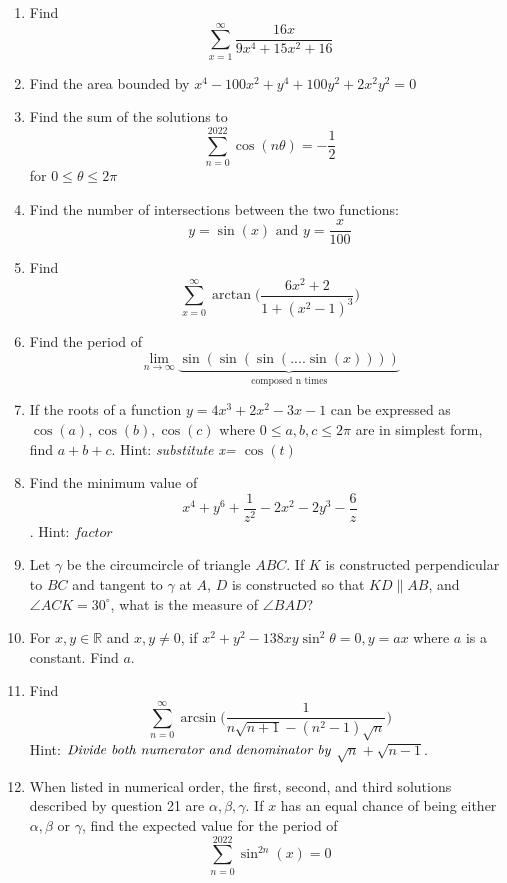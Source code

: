 \documentclass{article}
\begin{document}
\begin{enumerate}
    
    \item Find \[\sum_{x=1}^\infty \frac{16x}{9x^4+15x^2+16}\]
    \item Find the area bounded by $x^4-100x^2+y^4+100y^2+2x^2y^2=0$
    \newpage
    \item Find the sum of the solutions to \[\sum_{n=0}^{2022} \cos(n\theta) = -\frac{1}{2}\] for $ 0 \leq\theta \leq 2\pi$
    \item Find the number of intersections between the two functions: \[y=\sin(x) \textrm{ and } y=\frac{x}{100}\]
    \item Find \[\sum_{x=0}^\infty \arctan\Big(\frac{6x^2+2}{1+(x^2-1)^3}\Big)\]
    \item Find the period of \[\lim_{n \to \infty} \underbrace{\sin(\sin(\sin(....\sin(x))))}_{\text{composed n times}}\]
  	\item If the roots of a function $y=4x^3+2x^2-3x-1$ can be expressed as $\cos{(a)},\cos{(b)},\cos{(c)}$ where $ 0 \leq a,b,c \leq 2\pi$ are in simplest form, find $a+b+c$. Hint: \textit{substitute x= $\cos{(t)}$}
    \item Find the minimum value of \[x^4+y^6+\frac{1}{z^2}-2x^2-2y^3-\frac{6}{z}\]. Hint: $factor$
    \item Let $\gamma$ be the circumcircle of triangle $ABC$. If $K$ is constructed perpendicular to $BC$ and tangent to $\gamma$ at $A$, $D$ is constructed so that $KD\parallel AB$, and $\angle ACK = 30^{\circ}$, what is the measure of $\angle BAD$?
    \item For $x,y \in \mathbb{R}$ and $x,y \neq 0 $, if $x^2+y^2-138xy\sin^2{\theta}=0, y=ax$ where $a$ is a constant. Find $a$.
    \item Find \[\sum_{n=0}^{\infty} \arcsin{{\Big(\frac{1}{n\sqrt{n+1}-(n^2-1)\sqrt{n}}\Big)}}\]
    Hint: $\emph{Divide both numerator and denominator by}$ $\sqrt{n}+\sqrt{n-1}$.
    \item When listed in numerical order, the first, second, and third solutions described by question 21 are $\alpha, \beta, \gamma$. If $x$ has an equal chance of being either $\alpha, \beta$ or $\gamma$, find the expected value for the period of  \[\sum_{n=0}^{2022}\sin^{2n}(x)=0\]
\end{enumerate}

\end{document}
